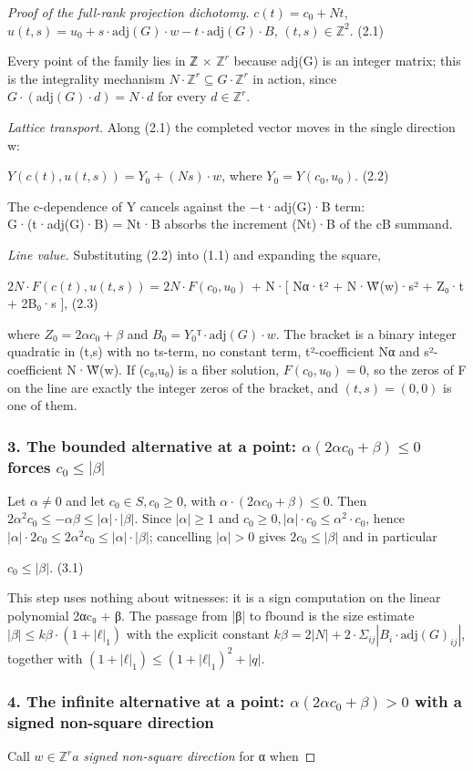 \begin{proof}[Proof of the full-rank projection dichotomy]
$c(t) = c_{0} + N t$,   $u(t,s) = u_{0} + s·\mathrm{adj}(G)·w − t·\mathrm{adj}(G)·B$,          $(t,s) ∈ ℤ^{2}$.      (2.1)

Every point of the family lies in ℤ × $ℤ^{r}$ because adj(G) is an integer matrix; this is the integrality mechanism $N·ℤ^{r} ⊆ G·ℤ^{r}$ in action, since $G·(\mathrm{adj}(G)·d) = N·d$ for every $d ∈ ℤ^{r}$.

\emph{Lattice transport.} Along (2.1) the completed vector moves in the single direction w:

$Y(c(t), u(t,s)) = Y_{0} + (N s)·w$,   where $Y_{0} = Y(c_{0},u_{0})$.           (2.2)

The c-dependence of Y cancels against the −t·adj(G)·B term: G·(t·adj(G)·B) = Nt·B absorbs the increment (Nt)·B of the cB summand.

\emph{Line value.} Substituting (2.2) into (1.1) and expanding the square,

$2N·F(c(t), u(t,s)) = 2N·F(c_{0},u_{0})$       + N·[ Nα·t² + N·W̃(w)·s² + Z₀·t + 2B₀·s ],                    (2.3)

where $Z_{0} = 2α c_{0} + β$ and $B_{0} = Y_{0}ᵀ·\mathrm{adj}(G)·w$. The bracket is a binary integer quadratic in (t,s) with no ts-term, no constant term, t²-coefficient Nα and s²-coefficient N·W̃(w). If (c₀,u₀) is a fiber solution, $F(c_{0},u_{0}) = 0$, so the zeros of F on the line are exactly the integer zeros of the bracket, and $(t,s) = (0,0)$ is one of them.

\subsubsection*{3. The bounded alternative at a point: $α(2αc_{0}+β) ≤ 0$ forces $c_{0} ≤ |β|$}
Let $α ≠ 0$ and let $c_{0} ∈ S, c_{0} ≥ 0$, with $α·(2α c_{0} + β) ≤ 0$. Then $2α^{2}c_{0} ≤ −αβ ≤ |α|·|β|$. Since $|α| ≥ 1$ and $c_{0} ≥ 0, |α|·c_{0} ≤ α^{2}·c_{0}$, hence $|α|·2c_{0} ≤ 2α^{2}c_{0} ≤ |α|·|β|$; cancelling $|α| > 0$ gives $2c_{0} ≤ |β|$ and in particular

$c_{0} ≤ |β|$.                                                        (3.1)

This step uses nothing about witnesses: it is a sign computation on the linear polynomial 2αc₀ + β. The passage from |β| to fbound is the size estimate $|β| ≤ kβ·(1+|ℓ|_{1})$ with the explicit constant $kβ = 2|N| + 2·Σ_{ij}|B_{i}·\mathrm{adj}(G)_{ij}|$, together with $(1+|ℓ|_{1}) ≤ (1+|ℓ|_{1})^{2} + |q|$.

\subsubsection*{4. The infinite alternative at a point: $α(2αc_{0}+β) > 0$ with a signed non-square direction}
Call $w ∈ ℤ^{r} a$ \emph{signed non-square direction} for α when


\end{proof}
